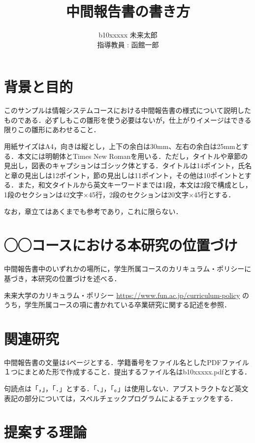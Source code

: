 \documentclass[11pt]{jarticle}
\author{%
b10xxxxx 未来太郎\\指導教員 : 函館一郎
}
\title{中間報告書の書き方}
\begin{document}
\maketitle

\section{背景と目的}

このサンプルは情報システムコースにおける中間報告書の様式について説明したものである．必ずしもこの雛形を使う必要はないが，仕上がりイメージはできる限りこの雛形にあわせること．

用紙サイズはA4，向きは縦とし，上下の余白は30mm、左右の余白は25mmとする．本文には明朝体とTimes New Romanを用いる．ただし，タイトルや章節の見出し，図表のキャプションはゴシック体とする．タイトルは14ポイント，氏名と章の見出しは12ポイント，節の見出しは11ポイント，その他は10ポイントとする．また，和文タイトルから英文キーワードまでは1段，本文は2段で構成とし，1段のセクションは42文字×45行，2段のセクションは20文字×45行とする．

なお，章立てはあくまでも参考であり，これに限らない．

\section{◯◯コースにおける本研究の位置づけ}
中間報告書中のいずれかの場所に，学生所属コースのカリキュラム・ポリシーに基づき，本研究の位置づけを述べる．

未来大学のカリキュラム・ポリシー
\url{https://www.fun.ac.jp/curriculum-policy} のうち，学生所属コースの項に書かれている卒業研究に関する記述を参照．

\section{関連研究}

中間報告書の文量は4ページとする．学籍番号をファイル名としたPDFファイル１つにまとめた形で作成すること．提出するファイル名はb10xxxxx.pdfとする．

句読点は「，」，「．」とする．「、」，「。」は使用しない．アブストラクトなど英文表記の部分については，スペルチェックプログラムによるチェックをする．

\section{提案する理論}
\end{document}
